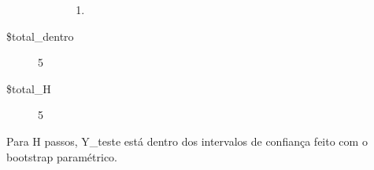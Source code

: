 \documentclass[11pt]{article}
\begin{document}
\begin{description}
\begin{description}
\begin{enumerate}
\item {}

\end{enumerate}

\end{description}

\item[\$total\_dentro] 5
\item[\$total\_H] 5
\end{description}


    
    Para H passos, Y\_teste está dentro dos intervalos de confiança feito
com o bootstrap paramétrico.


    
    
    
\end{document}
